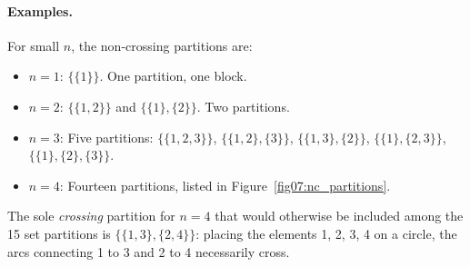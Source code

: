 \documentclass[11pt,letterpaper]{article}
\theoremstyle{plain}
\theoremstyle{definition}
\theoremstyle{remark}
\begin{document}
\paragraph{Examples.}
For small $n$, the non-crossing partitions are:
\begin{itemize}
  \item $n=1$: $\{\{1\}\}$.  One partition, one block.
  \item $n=2$: $\{\{1,2\}\}$ and $\{\{1\},\{2\}\}$.  Two partitions.
  \item $n=3$: Five partitions:
    $\{\{1,2,3\}\}$,
    $\{\{1,2\},\{3\}\}$,
    $\{\{1,3\},\{2\}\}$,
    $\{\{1\},\{2,3\}\}$,
    $\{\{1\},\{2\},\{3\}\}$.
  \item $n=4$: Fourteen partitions, listed in
    Figure~\ref{fig07:nc_partitions}.
\end{itemize}
The sole \emph{crossing} partition for $n=4$ that would otherwise be
included among the 15 set partitions is $\{\{1,3\},\{2,4\}\}$: placing
the elements 1, 2, 3, 4 on a circle, the arcs connecting 1 to 3 and 2 to 4
necessarily cross.
\end{document}
